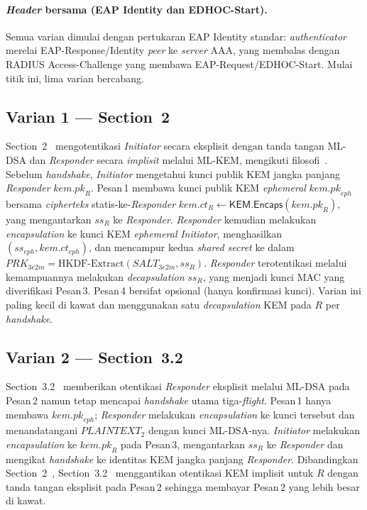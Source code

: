 \documentclass{easychair}
\newcommand{\VarSec}[1]{Section~#1~\cite{pq-edhoc-draft}}
\newcommand{\HKDFextract}{\mathrm{HKDF\text{-}Extract}}
\newcommand{\Encaps}{\mathsf{KEM.Encaps}}
\begin{document}
\paragraph{\emph{Header} bersama (EAP Identity dan EDHOC-Start).}
Semua varian dimulai dengan pertukaran EAP Identity standar:
\emph{authenticator} merelai EAP-Response/Identity \emph{peer} ke
\emph{server} AAA, yang membalas dengan RADIUS Access-Challenge yang
membawa EAP-Request/EDHOC-Start. Mulai titik ini, lima varian
bercabang.

\subsection{Varian 1 --- \texorpdfstring{\VarSec{2}}{Section 2 dari draft}}
\label{sec:variant-s2}
\VarSec{2} mengotentikasi \emph{Initiator} secara eksplisit dengan
tanda tangan ML-DSA dan \emph{Responder} secara \emph{implisit}
melalui ML-KEM, mengikuti filosofi~\cite{pocero}. Sebelum
\emph{handshake}, \emph{Initiator} mengetahui kunci publik KEM jangka
panjang \emph{Responder} $\mathit{kem.pk}_R$. Pesan\,1 membawa kunci
publik KEM \emph{ephemeral} $\mathit{kem.pk}_{\mathit{eph}}$ bersama
\emph{cipherteks} statis-ke-\emph{Responder}
$\mathit{kem.ct}_R \leftarrow \Encaps(\mathit{kem.pk}_R)$, yang
mengantarkan $\mathit{ss}_R$ ke \emph{Responder}. \emph{Responder}
kemudian melakukan \emph{encapsulation} ke kunci KEM \emph{ephemeral}
\emph{Initiator}, menghasilkan
$(\mathit{ss}_{\mathit{eph}},\mathit{kem.ct}_{\mathit{eph}})$, dan
mencampur kedua \emph{shared secret} ke dalam $\mathit{PRK}_{\mathit{3e2m}} =
\HKDFextract(\mathit{SALT}_{\mathit{3e2m}},\mathit{ss}_R)$.
\emph{Responder} terotentikasi melalui kemampuannya melakukan
\emph{decapsulation} $\mathit{ss}_R$, yang menjadi kunci MAC yang
diverifikasi Pesan\,3. Pesan\,4 bersifat opsional (hanya konfirmasi
kunci). Varian ini paling kecil di kawat dan menggunakan satu
\emph{decapsulation} KEM pada $R$ per \emph{handshake}.

\subsection{Varian 2 --- \texorpdfstring{\VarSec{3.2}}{Section 3.2 dari draft}}
\label{sec:variant-s32}
\VarSec{3.2} memberikan otentikasi \emph{Responder} eksplisit melalui
ML-DSA pada Pesan\,2 namun tetap mencapai \emph{handshake} utama
tiga-\emph{flight}. Pesan\,1 hanya membawa
$\mathit{kem.pk}_{\mathit{eph}}$; \emph{Responder} melakukan
\emph{encapsulation} ke kunci tersebut dan menandatangani $PLAINTEXT_2$
dengan kunci ML-DSA-nya. \emph{Initiator} melakukan \emph{encapsulation}
ke $\mathit{kem.pk}_R$ pada Pesan\,3, mengantarkan $\mathit{ss}_R$
ke \emph{Responder} dan mengikat \emph{handshake} ke identitas KEM
jangka panjang \emph{Responder}. Dibandingkan \VarSec{2},
\VarSec{3.2} menggantikan otentikasi KEM implisit untuk $R$ dengan
tanda tangan eksplisit pada Pesan\,2 sehingga membayar Pesan\,2 yang
lebih besar di kawat.
\end{document}
